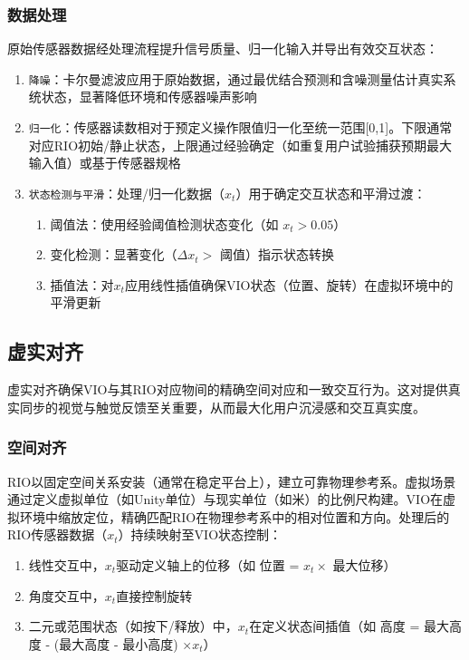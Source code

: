 \documentclass[runningheads]{llncs}
\begin{document}
\subsubsection{数据处理}
原始传感器数据经处理流程提升信号质量、归一化输入并导出有效交互状态：
\begin{enumerate}
  \item \texttt{降噪}：卡尔曼滤波应用于原始数据，通过最优结合预测和含噪测量估计真实系统状态，显著降低环境和传感器噪声影响
  \item \texttt{归一化}：传感器读数相对于预定义操作限值归一化至统一范围[0,1]。下限通常对应RIO初始/静止状态，上限通过经验确定（如重复用户试验捕获预期最大输入值）或基于传感器规格
  \item \texttt{状态检测与平滑}：处理/归一化数据（$x_t$）用于确定交互状态和平滑过渡：
  \begin{enumerate}
    \item 阈值法：使用经验阈值检测状态变化（如 $x_t > 0.05$）
    \item 变化检测：显著变化（$\Delta x_t >$ 阈值）指示状态转换
    \item 插值法：对$x_t$应用线性插值确保VIO状态（位置、旋转）在虚拟环境中的平滑更新
  \end{enumerate}
\end{enumerate}

\subsection{虚实对齐}
虚实对齐确保VIO与其RIO对应物间的精确空间对应和一致交互行为。这对提供真实同步的视觉与触觉反馈至关重要，从而最大化用户沉浸感和交互真实度。

\subsubsection{空间对齐}
RIO以固定空间关系安装（通常在稳定平台上），建立可靠物理参考系。虚拟场景通过定义虚拟单位（如Unity单位）与现实单位（如米）的比例尺构建。VIO在虚拟环境中缩放定位，精确匹配RIO在物理参考系中的相对位置和方向。处理后的RIO传感器数据（$x_t$）持续映射至VIO状态控制：
\begin{enumerate}
  \item 线性交互中，$x_t$驱动定义轴上的位移（如 位置 = $x_t \times$ 最大位移）
  \item 角度交互中，$x_t$直接控制旋转
  \item 二元或范围状态（如按下/释放）中，$x_t$在定义状态间插值（如 高度 = 最大高度 - (最大高度 - 最小高度) $\times x_t$）
\end{enumerate}
\end{document}
